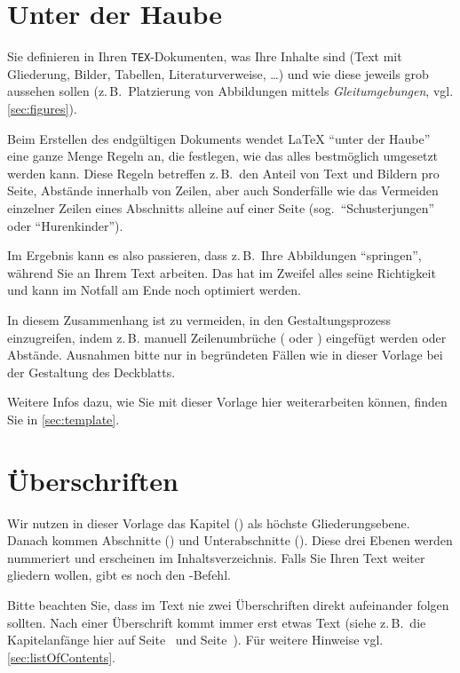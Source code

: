 \section{Unter der Haube}
\label{sec:hood}
Sie definieren in Ihren \texttt{TEX}-Dokumenten, was Ihre Inhalte sind (Text mit Gliederung, Bilder, Tabellen, Literaturverweise, \ldots) und wie diese jeweils grob aussehen sollen (z.\,B.\ Platzierung von Abbildungen mittels \emph{Gleitumgebungen}, vgl. \cref{sec:figures}).
\par
Beim Erstellen des endgültigen Dokuments wendet \LaTeX{} \enquote{unter der Haube} eine ganze Menge Regeln an, die festlegen, wie das alles bestmöglich umgesetzt werden kann. Diese Regeln betreffen z.\,B.\ den Anteil von Text und Bildern pro Seite, Abstände innerhalb von Zeilen, aber auch Sonderfälle wie das Vermeiden einzelner Zeilen eines Abschnitts alleine auf einer Seite (sog.\ \enquote{Schusterjungen} oder \enquote{Hurenkinder}).
\par
Im Ergebnis kann es also passieren, dass z.\,B.\ Ihre Abbildungen \enquote{springen}, während Sie an Ihrem Text arbeiten. Das hat im Zweifel alles seine Richtigkeit und kann im Notfall am Ende noch optimiert werden.
\par
In diesem Zusammenhang ist zu vermeiden, in den Gestaltungsprozess einzugreifen, indem z.\,B. manuell Zeilenumbrüche ( oder \comm{\textbackslash}) eingefügt werden oder Abstände. Ausnahmen bitte nur in begründeten Fällen wie in dieser Vorlage bei der Gestaltung des Deckblatts.
\par
Weitere Infos dazu, wie Sie mit dieser Vorlage hier weiterarbeiten können, finden Sie in \cref{sec:template}.
%
%
\section{Überschriften}
\label{sec:headings}
Wir nutzen in dieser Vorlage das Kapitel () als höchste Gliederungsebene. Danach kommen Abschnitte () und Unterabschnitte (). Diese drei Ebenen werden nummeriert und erscheinen im Inhaltsverzeichnis. Falls Sie Ihren Text weiter gliedern wollen, gibt es noch den -Befehl.
\par
Bitte beachten Sie, dass im Text nie zwei Überschriften direkt aufeinander folgen sollten. Nach einer Überschrift kommt immer erst etwas Text (siehe z.\,B.\ die Kapitelanfänge hier auf Seite~\pageref{chap:formal} und Seite~\pageref{chap:Textsatz}). Für weitere Hinweise vgl. \cref{sec:listOfContents}.
%
%
